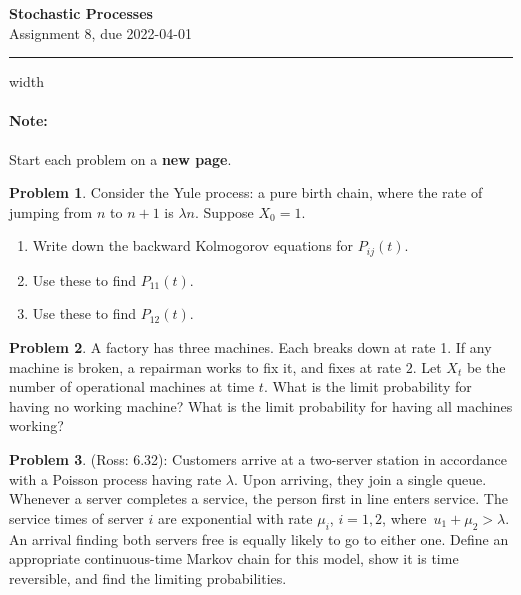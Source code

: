 \documentclass{article}
\theoremstyle{definition}
\newtheorem{problem}{Problem}
\begin{document}
\thispagestyle{crfooter}

\begin{center}
  {\LARGE \textbf{Stochastic Processes}} \\ \medskip
  {\Large Assignment 8, due 2022-04-01}
\end{center}

\hrule width \textwidth

\paragraph{Note:} Start each problem on a \textbf{new page}.%


\begin{problem}
  Consider the Yule process: a pure birth chain, where the rate of jumping from $n$ to $n+1$ is $\lambda n$.
  Suppose $X_0=1$.
  \begin{enumerate}
  \item Write down the backward Kolmogorov equations for $P_{ij}(t)$.
  \item Use these to find $P_{11}(t)$.
  \item Use these to find $P_{12}(t)$.
  \end{enumerate}
\end{problem}


\begin{problem}
  A factory has three machines. Each breaks down at rate 1.
  If any machine is broken, a repairman works to fix it, and fixes at rate $2$.
  Let $X_t$ be the number of operational machines at time $t$.
  What is the limit probability for having no working machine?
  What is the limit probability for having all machines working?
\end{problem}


\begin{problem}(Ross: 6.32):
  Customers arrive at a two-server station in accordance with a Poisson process
  having rate $\lambda$.
  Upon arriving, they join a single queue. Whenever a server completes a service, the person first in line enters service. The service times of
  server $i$ are exponential with rate $\mu_i$, $i=1,2$, where $\,u_1 + \mu_2 > \lambda$.
  An arrival finding both servers free is equally likely to go to either one. Define an appropriate continuous-time Markov chain for this model, show it is time reversible, and find the limiting probabilities.
\end{problem}
\end{document}
